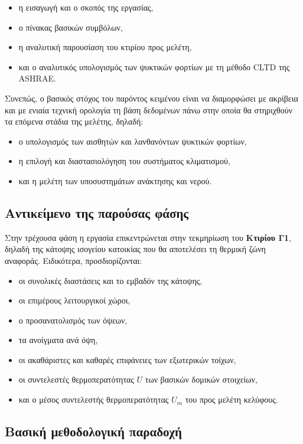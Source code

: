 \documentclass[12pt,a4paper]{article}
\begin{document}
\begin{itemize}
\item η εισαγωγή και ο σκοπός της εργασίας,
\item ο πίνακας βασικών συμβόλων,
\item η αναλυτική παρουσίαση του κτιρίου προς μελέτη,
\item και ο αναλυτικός υπολογισμός των ψυκτικών φορτίων με τη μέθοδο \textenglish{CLTD} της \textenglish{ASHRAE}.
\end{itemize}

Συνεπώς, ο βασικός στόχος του παρόντος κειμένου είναι να διαμορφώσει με ακρίβεια και
με ενιαία τεχνική ορολογία τη βάση δεδομένων πάνω στην οποία θα στηριχθούν τα επόμενα
στάδια της μελέτης, δηλαδή:

\begin{itemize}
\item ο υπολογισμός των αισθητών και λανθανόντων ψυκτικών φορτίων,
\item η επιλογή και διαστασιολόγηση του συστήματος κλιματισμού,
\item και η μελέτη των υποσυστημάτων ανάκτησης και νερού.
\end{itemize}

\subsection{Αντικείμενο της παρούσας φάσης}

Στην τρέχουσα φάση η εργασία επικεντρώνεται στην τεκμηρίωση του \textbf{Κτιρίου Γ1},
δηλαδή της κάτοψης ισογείου κατοικίας που θα αποτελέσει τη θερμική ζώνη αναφοράς.
Ειδικότερα, προσδιορίζονται:

\begin{itemize}
\item οι συνολικές διαστάσεις και το εμβαδόν της κάτοψης,
\item οι επιμέρους λειτουργικοί χώροι,
\item ο προσανατολισμός των όψεων,
\item τα ανοίγματα ανά όψη,
\item οι ακαθάριστες και καθαρές επιφάνειες των εξωτερικών τοίχων,
\item οι συντελεστές θερμοπερατότητας \(U\) των βασικών δομικών στοιχείων,
\item και ο μέσος συντελεστής θερμοπερατότητας \(U_m\) του προς μελέτη κελύφους.
\end{itemize}

\subsection{Βασική μεθοδολογική παραδοχή}
\end{document}
